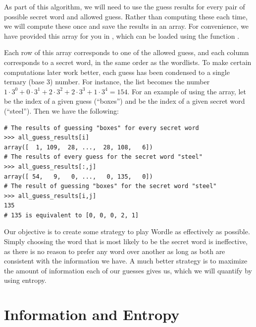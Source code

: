 As part of this algorithm, we will need to use the guess results for every pair of possible secret word and allowed guess.
Rather than computing these each time, we will compute these once and save the results in an array.
For convenience, we have provided this array for you in , which can be loaded using the function .

Each row of this array corresponds to one of the allowed guess, and each column corresponds to a secret word, in the same order as the wordlists.
To make certain computations later work better, each guess has been condensed to a single ternary (base 3) number.
For instance, the list \li{[1,0,2,2,1]} becomes the number \(1\cdot 3^0 + 0\cdot 3^1+2\cdot 3^2+2\cdot 3^3+1\cdot 3^4=154\).
For an example of using the array, let  be the index of a given guess (``boxes'') and  be the index of a given secret word (``steel'').
Then we have the following:
\begin{lstlisting}
# The results of guessing "boxes" for every secret word
>>> all_guess_results[i]
array([  1, 109,  28, ...,  28, 108,   6])
# The results of every guess for the secret word "steel"
>>> all_guess_results[:,j]
array([ 54,   9,   0, ...,   0, 135,   0])
# The result of guessing "boxes" for the secret word "steel"
>>> all_guess_results[i,j]
135
# 135 is equivalent to [0, 0, 0, 2, 1]
\end{lstlisting}

Our objective is to create some strategy to play Wordle as effectively as possible.
Simply choosing the word that is most likely to be the secret word is ineffective, as there is no reason to prefer any word over another as long as both are consistent with the information we have.
A much better strategy is to maximize the amount of information each of our guesses gives us, which we will quantify by using entropy.


\section*{Information and Entropy}

